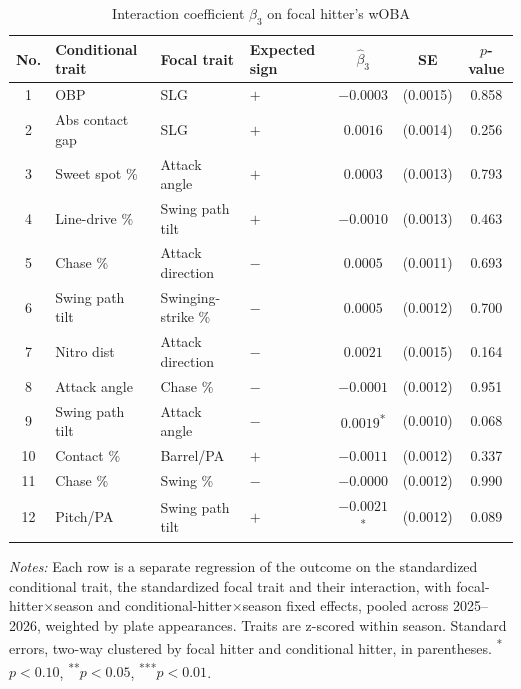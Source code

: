 \begin{table}[htbp]
\centering
\small
\caption{Interaction coefficient $\beta_3$ on focal hitter's wOBA}
\label{tab:table1_woba_pooled}
\begin{tabular}{clllccc}
\toprule
No. & Conditional trait & Focal trait & Expected sign & $\hat\beta_3$ & SE & $p$-value \\
\midrule
1 & OBP & SLG & $+$ & $-0.0003$ & (0.0015) & 0.858 \\
2 & Abs contact gap & SLG & $+$ & $0.0016$ & (0.0014) & 0.256 \\
3 & Sweet spot \% & Attack angle & $+$ & $0.0003$ & (0.0013) & 0.793 \\
4 & Line-drive \% & Swing path tilt & $+$ & $-0.0010$ & (0.0013) & 0.463 \\
5 & Chase \% & Attack direction & $-$ & $0.0005$ & (0.0011) & 0.693 \\
6 & Swing path tilt & Swinging-strike \% & $-$ & $0.0005$ & (0.0012) & 0.700 \\
7 & Nitro dist & Attack direction & $-$ & $0.0021$ & (0.0015) & 0.164 \\
8 & Attack angle & Chase \% & $-$ & $-0.0001$ & (0.0012) & 0.951 \\
9 & Swing path tilt & Attack angle & $-$ & $0.0019$\textsuperscript{*} & (0.0010) & 0.068 \\
10 & Contact \% & Barrel/PA & $+$ & $-0.0011$ & (0.0012) & 0.337 \\
11 & Chase \% & Swing \% & $-$ & $-0.0000$ & (0.0012) & 0.990 \\
12 & Pitch/PA & Swing path tilt & $+$ & $-0.0021$\textsuperscript{*} & (0.0012) & 0.089 \\
\bottomrule
\end{tabular}
\par\smallskip\parbox{0.95\textwidth}{\footnotesize \textit{Notes:} Each row is a separate regression of the outcome on the standardized conditional trait, the standardized focal trait and their interaction, with focal-hitter$\times$season and conditional-hitter$\times$season fixed effects, pooled across 2025--2026, weighted by plate appearances. Traits are z-scored within season. Standard errors, two-way clustered by focal hitter and conditional hitter, in parentheses. \textsuperscript{*}$p<0.10$, \textsuperscript{**}$p<0.05$, \textsuperscript{***}$p<0.01$.}
\end{table}
